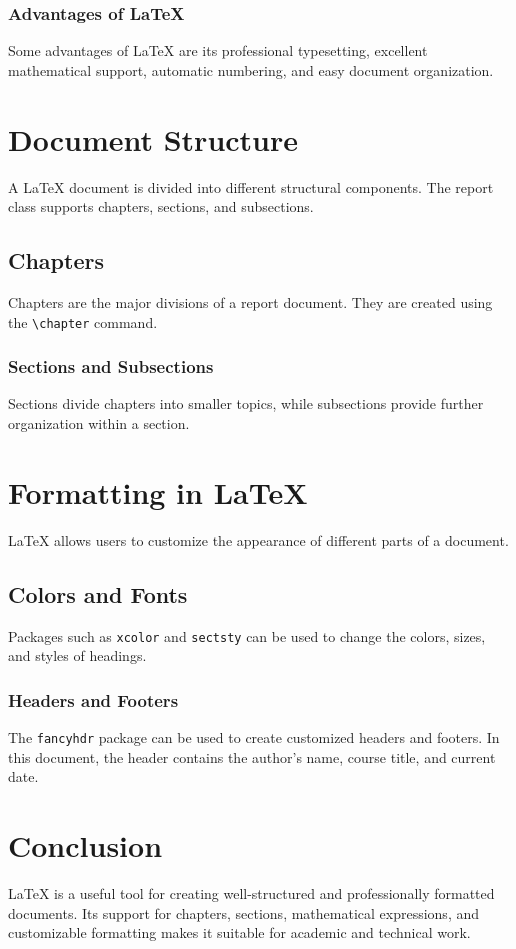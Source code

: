 \documentclass[12pt,a4paper]{report}
\begin{document}
	\subsection{Advantages of LaTeX}
	
	Some advantages of LaTeX are its professional typesetting, excellent
	mathematical support, automatic numbering, and easy document
	organization.
	
	\chapter{Document Structure}
	
	A LaTeX document is divided into different structural components.
	The report class supports chapters, sections, and subsections.
	
	\section{Chapters}
	
	Chapters are the major divisions of a report document. They are created
	using the \texttt{\textbackslash chapter} command.
	
	\subsection{Sections and Subsections}
	
	Sections divide chapters into smaller topics, while subsections provide
	further organization within a section.
	
	\chapter{Formatting in LaTeX}
	
	LaTeX allows users to customize the appearance of different parts of
	a document.
	
	\section{Colors and Fonts}
	
	Packages such as \texttt{xcolor} and \texttt{sectsty} can be used to
	change the colors, sizes, and styles of headings.
	
	\subsection{Headers and Footers}
	
	The \texttt{fancyhdr} package can be used to create customized headers
	and footers. In this document, the header contains the author's name,
	course title, and current date.
	
	\chapter{Conclusion}
	
	LaTeX is a useful tool for creating well-structured and professionally
	formatted documents. Its support for chapters, sections, mathematical
	expressions, and customizable formatting makes it suitable for academic
	and technical work.
	
\end{document}

